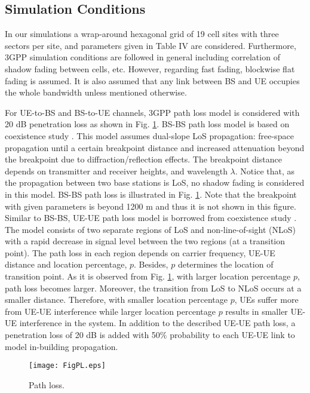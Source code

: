 \documentclass[twocolumn]{IEEEtran}
\begin{document}
\subsection{Simulation Conditions}

In our simulations a wrap-around hexagonal grid of 19 cell sites
with three sectors per site, and parameters given in Table IV are
considered. Furthermore, 3GPP simulation conditions \cite{3gpp} are
followed in general including correlation of shadow fading between
cells, etc. However, regarding fast fading, blockwise flat fading is
assumed. It is also assumed that any link between BS and UE occupies
the whole bandwidth unless mentioned otherwise.

For UE-to-BS and BS-to-UE channels, 3GPP path loss model \cite{3gpp}
is considered with 20 dB penetration loss as shown in Fig. \ref{pl}.
BS-BS path loss model is based on coexistence study \cite{coex}.
This model assumes dual-slope LoS propagation: free-space
propagation until a certain breakpoint distance and increased
attenuation beyond the breakpoint due to diffraction/reflection
effects. The breakpoint distance depends on transmitter and receiver
heights, and wavelength $\lambda$. Notice that, as the propagation
between two base stations is LoS, no shadow fading is considered in
this model. BS-BS path loss is illustrated in Fig. \ref{pl}. Note
that the breakpoint with given parameters is beyond 1200 m and thus
it is not shown in this figure. Similar to BS-BS, UE-UE path loss
model is borrowed from coexistence study \cite{coex}. The model
consists of two separate regions of LoS and non-line-of-sight (NLoS)
with a rapid decrease in signal level between the two regions (at a
transition point). The path loss in each region depends on carrier
frequency, UE-UE distance and location percentage, $p$. Besides, $p$
determines the location of transition point. As it is observed from
Fig. \ref{pl}, with larger location percentage $p$, path loss
becomes larger. Moreover, the transition from LoS to NLoS occurs at
a smaller distance. Therefore, with smaller location percentage $p$,
UEs suffer more from UE-UE interference while larger location
percentage $p$ results in smaller UE-UE interference in the system.
In addition to the described UE-UE path loss, a penetration loss of
20 dB is added with 50\% probability to each UE-UE link to model
in-building propagation.


\begin{figure}[!t]

\centering
    {\texttt{[image: FigPL.eps]}}


\caption{Path loss. \label{pl} }

\end{figure}
\end{document}
